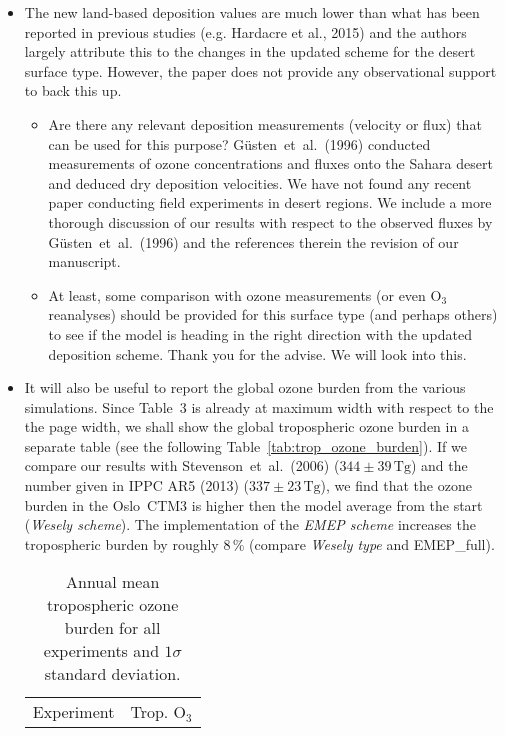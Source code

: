 \begin{itemize}
\begin{itemize}
  \item {\color{blue}  The new land-based deposition values are much lower than what has
    been reported in previous studies (e.g. Hardacre et al., 2015) and the authors largely
    attribute this to the changes in the updated scheme for the desert surface type. However,
    the paper does not provide any observational support to back this up. }
    \begin{itemize}
    \item {\color{blue}  Are there any relevant deposition measurements (velocity or flux) that can be used for this purpose?}
      G\"{u}sten~et~al.~(1996) conducted measurements of ozone concentrations
      and fluxes onto the Sahara desert and deduced dry deposition velocities.
      We have not found any recent paper conducting field experiments in desert regions. We include a more
      thorough discussion of our results with respect to the observed fluxes by G\"{u}sten~et~al.~(1996) and the
      references therein the revision of our manuscript. 
    \item {\color{blue}  At least, some comparison with ozone measurements (or even $\mathrm{O_3}$ reanalyses)
      should be provided for this surface type (and perhaps others) to see if the model is
      heading in the right direction with the updated deposition scheme.}
      Thank you for the advise. We will look into this.
    \end{itemize}
  \item {\color{blue}  It will also be useful to report the global ozone burden from the various
    simulations.}
    Since Table~3 is already at maximum width with respect to the the page width, we shall show the global
    tropospheric ozone burden in a separate table (see the following Table~\ref{tab:trop_ozone_burden}). If we compare our results
    with Stevenson~et~al.~(2006)
    ($344\pm 39\,\mathrm{Tg}$) and the number given in IPPC AR5 (2013) ($337\pm 23\,\mathrm{Tg}$), we find
    that the ozone burden in the Oslo~CTM3 is higher then the model average from the start (\emph{Wesely scheme}).
    The implementation of the \emph{EMEP scheme}
    increases the tropospheric burden by roughly 8\,\% (compare \emph{Wesely type} and EMEP\_full).
    \begin{table*}[h]
        \caption{Annual mean tropospheric ozone burden for all experiments and $1 \sigma$ standard deviation.}
        \centering
        \begin{tabular}{lrcl}
          \hline
          Experiment & \multicolumn{3}{c}{Trop. $\mathrm{O_3}$}\\

\end{tabular}
\end{table*}
\end{itemize}
\end{itemize}
